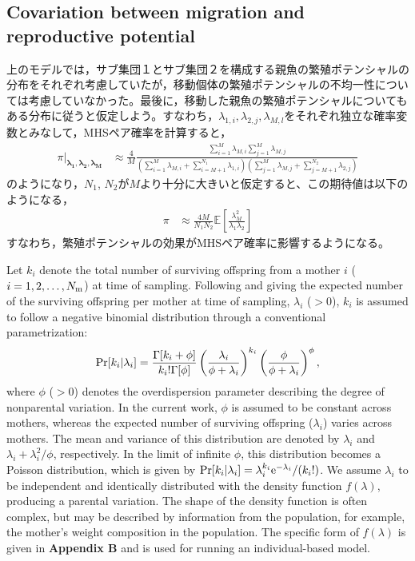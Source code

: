 \documentclass[AMA,STIX1COL]{WileyNJD-v2}
\begin{document}
\subsection{Covariation between migration and reproductive potential}

上のモデルでは，サブ集団１とサブ集団２を構成する親魚の繁殖ポテンシャルの分布をそれぞれ考慮していたが，移動個体の繁殖ポテンシャルの不均一性については考慮していなかった。最後に，移動した親魚の繁殖ポテンシャルについてもある分布に従うと仮定しよう。すなわち，$\lambda_{1,i}, \lambda_{2,j}, \lambda_{M,l}$をそれぞれ独立な確率変数とみなして，MHSペア確率を計算すると，
\begin{align}
\pi | _{\boldsymbol{\lambda_1, \lambda_2, \lambda_M}} &\approx \frac{4}{M} \frac{ \sum_{i=1}^M \lambda_{M,i} \sum_{j=1}^M \lambda_{M,j} } {\left(\sum_{i=1}^{M} \lambda_{M,i} + \sum_{i=M+1}^{N_1} \lambda_{1,i}\right) \left(\sum_{j=1}^{M} \lambda_{M,j} + \sum_{j=M+1}^{N_2} \lambda_{2,j}\right) } 
\end{align}
のようになり，$N_1$, $N_2$が$M$より十分に大きいと仮定すると、この期待値は以下のようになる，
\begin{align}
\pi &\approx \frac{4M}{N_{1}N_{2}} \mathbb{E}\left[ \frac{ \lambda_M^2 }{\lambda_1\lambda_2} \right]
\label{5-1}
\end{align}
すなわち，繁殖ポテンシャルの効果がMHSペア確率に影響するようになる。

Let $k_i$ denote the total number of surviving offspring from a mother  $i$ ($i= 1, 2, \dots, N_{\rm m}$) at time of sampling. Following \cite{Akita_2019} and giving the expected number of the surviving offspring per mother at time of sampling, $\lambda_i$ ($>0$), $k_i$ is assumed to follow a negative binomial distribution through a conventional parametrization:
\begin{equation}
{\rm Pr}[ k_i | \lambda_i ] = \frac{\Gamma[k_i+\phi]}{k_i! \Gamma[\phi]} \left( \frac{\lambda_i}{\phi+\lambda_i} \right)^{k_i} \left( \frac{\phi}{\phi+\lambda_i} \right)^{\phi}, 
\label{NB}
\end{equation}
where $\phi$ ($>0$) denotes the overdispersion parameter describing the degree of nonparental variation. In the current work, $\phi$ is assumed to be constant across mothers, whereas the expected number of surviving offspring ($\lambda_i$) varies across mothers. The mean and variance of this distribution are denoted by $\lambda_i$ and $\lambda_i + \lambda_i^2/\phi$, respectively. In the limit of infinite $\phi$, this distribution becomes a Poisson distribution, which is given by ${\rm Pr}[ k_i | \lambda_i ]=\lambda_i^{k_i} \mathrm{e}^{-\lambda_i}/(k_i!)$. We assume $\lambda_i$ to be independent and identically distributed with the density function $f(\lambda)$, producing a parental variation. The shape of the density function is often complex, but may be described by information from the population, for example, the mother's weight composition in the population. The specific form of $f(\lambda)$ is given in {\bf Appendix B} and is used for running an individual-based model.  
\end{document}
